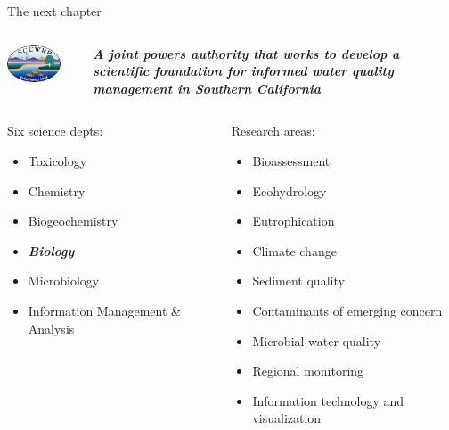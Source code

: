 \documentclass[serif]{beamer}\usepackage[]{graphicx}\usepackage[]{color}
\newcommand{\emtxt}[1]{\textbf{\textit{#1}}}
\begin{document}
\begin{frame}[t]{The next chapter}{}
\begin{columns}
\begin{column}{0.3\textwidth}
\centerline{\includegraphics[width = 0.8\textwidth]{fig/sccwrp.png}}
\end{column}
\begin{column}{0.7\textwidth}
\emtxt{A joint powers authority that works to develop a scientific foundation for informed water quality management in Southern California}
\end{column}
\end{columns}
\vspace{0.1in}
\begin{columns}[T]
\begin{column}{0.5\textwidth}
Six science depts:
\vspace{0.1in}
{\footnotesize
\begin{itemize}
\item Toxicology
\item Chemistry
\item Biogeochemistry
\item \emtxt{Biology}
\item Microbiology
\item Information Management \& Analysis
\end{itemize}
}
\end{column}
\begin{column}{0.5\textwidth}
Research areas:
{\footnotesize
\begin{itemize}
\item Bioassessment
\item Ecohydrology
\item Eutrophication
\item Climate change
\item Sediment quality
\item Contaminants of emerging concern
\item Microbial water quality
\item Regional monitoring
\item Information technology and visualization
\end{itemize}
}
\end{column}
\end{columns}
\end{frame}
\end{document}
